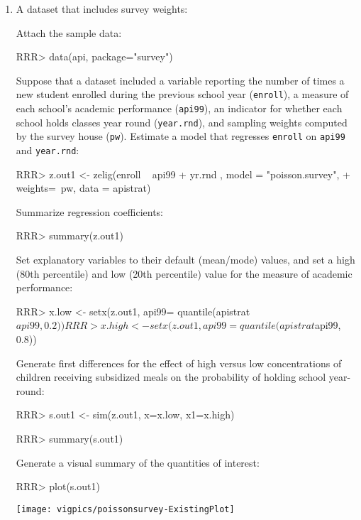 \begin{enumerate} 

\item A dataset that includes survey weights:

Attach the sample data: 
\begin{Schunk}
\begin{Sinput}
RRR> data(api, package="survey") 
\end{Sinput}
\end{Schunk}

Suppose that a dataset included a variable reporting the number of
times a new student enrolled during the previous school year ({\tt enroll}), 
a measure of each school's academic performance ({\tt api99}), 
an indicator for whether each school holds classes year round ({\tt year.rnd}), and sampling 
weights computed by the survey house ({\tt pw}).  Estimate a model
that regresses {\tt enroll} on {\tt api99} and {\tt year.rnd}:
\begin{Schunk}
\begin{Sinput}
RRR> z.out1 <- zelig(enroll ~ api99 + yr.rnd , model = "poisson.survey", 
+ weights=~pw, data = apistrat)
\end{Sinput}
\end{Schunk}
Summarize regression coefficients:
\begin{Schunk}
\begin{Sinput}
RRR>  summary(z.out1)
\end{Sinput}
\end{Schunk}
Set explanatory variables to their default (mean/mode) values, and
set a high (80th percentile) and low (20th percentile) value for
the measure of academic performance:
\begin{Schunk}
\begin{Sinput}
RRR> x.low <- setx(z.out1, api99= quantile(apistrat$api99, 0.2))
RRR> x.high <- setx(z.out1, api99= quantile(apistrat$api99, 0.8))
\end{Sinput}
\end{Schunk}
Generate first differences for the
effect of high versus low concentrations of children receiving
subsidized meals on the probability of holding school year-round: 
\begin{Schunk}
\begin{Sinput}
RRR> s.out1 <- sim(z.out1, x=x.low, x1=x.high)
\end{Sinput}
\end{Schunk}
\begin{Schunk}
\begin{Sinput}
RRR>  summary(s.out1)
\end{Sinput}
\end{Schunk}
Generate a visual summary of the quantities of interest:
\begin{center}
\begin{Schunk}
\begin{Sinput}
RRR>  plot(s.out1)
\end{Sinput}
\end{Schunk}
\texttt{[image: vigpics/poissonsurvey-ExistingPlot]}
\end{center}


\end{enumerate}
